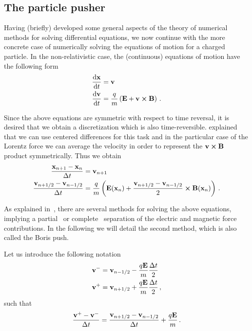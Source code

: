 \documentclass[class=report, crop=false]{standalone}
\begin{document}
\subsection{The particle pusher}

Having (briefly) developed some general aspects of the theory of numerical methods
for solving differential equations, we now continue with the more concrete case
of numerically solving the equations of motion for a charged particle.
In the non-relativistic case, the (continuous) equations of motion have the
following form
\begin{align*}
  \dv{\vb{x}}{t} &= \vb{v} \\
  \dv{\vb{v}}{t} &= \frac{q}{m} \left(\vb{E} + \vb{v}\cp\vb{B}\right)\,.
\end{align*}

Since the above equations are symmetric with respect to time reversal, it is
desired that we obtain a discretization which is also time-reversible.
\Textcite{buneman_timereversibledifference_1967} explained that we can
use centered differences for this task and in the particular case of the
Lorentz force we can average the velocity in order to represent the
\(\vb{v} \cp \vb{B}\) product symmetrically. Thus we obtain
\begin{align}
  \label{eq:lorentz-discrete-x}
  \frac{\vb{x}_{n+1}-\vb{x}_n}{\Delta t} &= \vb{v}_{n+1} \\
  \label{eq:lorentz-discrete-v}
  \frac{\vb{v}_{n+1/2}-\vb{v}_{n-1/2}}{\Delta t} &= \frac{q}{m}
    \left(\vb{E}(\vb{x}_n) + \frac{\vb{v}_{n+1/2}-\vb{v}_{n-1/2}}{2} \cp \vb{B}(\vb{x}_n)\right)\,.
\end{align}

As explained in~\textcite[Chapter 4-3]{birdsall_plasmaphysics_2005}, there are
several methods for solving the above equations, implying a
partial~\autocite{buneman_timereversibledifference_1967} or
complete~\autocite{boris_relativisticplasma_1970} separation of the electric
and magnetic force contributions. In the following we will detail the second
method, which is also called the Boris push.

Let us introduce the following notation
\begin{align*}
  \vb{v}^- &= \vb{v}_{n-1/2} - \frac{q \vb{E}}{m} \frac{\Delta t}{2} \\
  \vb{v}^+ &= \vb{v}_{n+1/2} + \frac{q \vb{E}}{m} \frac{\Delta t}{2}\,,
\end{align*}
such that
\[
\frac{\vb{v}^+ - \vb{v}^-}{\Delta t} = \frac{\vb{v}_{n+1/2} - \vb{v}_{n-1/2}}{\Delta t}
+ \frac{q \vb{E}}{m}\,.
\]
\end{document}
